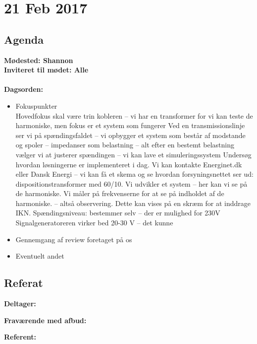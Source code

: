 \chapter*{21 Feb 2017}

\section*{Agenda}

\textbf{Mødested: Shannon}  \\
\textbf{Inviteret til mødet: Alle} \\\\
\textbf{Dagsorden:}\\

\begin{itemize}
	\item Fokuspunkter \\
Hovedfokus skal være trin kobleren – vi har en transformer for vi kan teste de harmoniske, men fokus er et system som fungerer
Ved en transmissionslinje ser vi på spændingsfaldet – vi opbygger et system som består af modstande og spoler – impedanser som belastning – alt efter en bestemt belastning vælger vi at justerer spændingen – vi kan lave et simuleringssystem 
Undersøg hvordan løsningerne er implementeret i dag. 
Vi kan kontakte Energinet.dk eller Dansk Energi – vi kan få et skema og se hvordan forsyningsnettet ser ud: dispositionstransformer med 60/10. 
Vi udvikler et system – her kan vi se på de harmoniske. Vi måler på frekvenserne for at se på indholdet af de harmoniske. – altså observering. Dette kan vises på en skræm for at inddrage IKN. 
Spændingsniveau: bestemmer selv – der er mulighed for 230V
Signalgeneratoreren virker bed 20-30 V – det kunne

	\item Gennemgang af review foretaget på os
	\item Eventuelt andet
\end{itemize}

\section*{Referat}
\textbf{Deltager:} 

\textbf{Fraværende med afbud:} 

\textbf{Referent:} 




